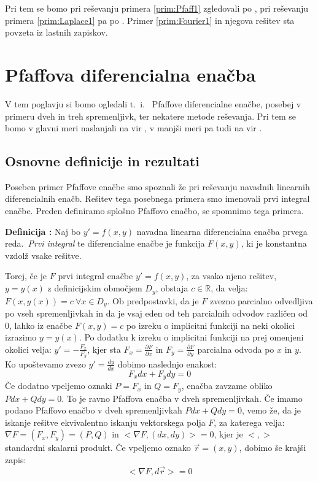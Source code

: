 \documentclass[a4paper, 10pt]{article}
\newcounter{defcount}
\newenvironment{definicija}{\begin{flushleft}\refstepcounter{defcount}\textbf{Definicija \arabic{defcount}:}}{\hfill\end{flushleft}}
\newcommand{\mth}[1]{\ensuremath{\mathbb{#1}}}
\newcommand{\R}{\mth{R}}
\newcommand{\pojem}[1]{\emph{#1}}
\begin{document}
		Pri tem se bomo pri reševanju primera \ref{prim:Pfaff1} zgledovali po \cite{bib:raman}, pri reševanju primera \ref{prim:Laplace1} pa po \cite{bib:Mag}. Primer \ref{prim:Fourier1} in njegova rešitev sta povzeta iz lastnih zapiskov.
		
	\section{Pfaffova diferencialna enačba}
		V tem poglavju si bomo ogledali t.~i.~ Pfaffove diferencialne enačbe, posebej v primeru dveh in treh spremenljivk, ter nekatere metode reševanja. Pri tem se bomo v glavni meri naslanjali na vir \cite{bib:raman}, v manjši meri pa tudi na vir \cite{bib:pfaff}.
		\subsection{Osnovne definicije in rezultati}
			Poseben primer Pfaffove enačbe smo spoznali že pri reševanju navadnih linearnih diferencialnih enačb. Rešitev tega posebnega primera smo imenovali prvi integral enačbe. Preden definiramo splošno Pfaffovo enačbo, se spomnimo tega primera.
			
			\begin{definicija}
				\label{def:1stint}
				Naj bo $y' = f(x, y)$ navadna linearna diferencialna enačba prvega reda.~\pojem{Prvi integral} te diferencialne enačbe je funkcija $F(x, y)$, ki je konstantna vzdolž vsake rešitve.
			\end{definicija}
			Torej, če je $F$ prvi integral enačbe $y' = f(x, y)$, za vsako njeno rešitev, $y = y(x)$ z definicijskim območjem $D_y$, obstaja $c\in\R$, da velja: $F(x, y(x)) = c ~\forall x\in D_y$. Ob predpostavki, da je $F$ zvezno parcialno odvedljiva po vseh spremenljivkah in da je vsaj eden od teh parcialnih odvodov različen od $0$, lahko iz enačbe $F(x, y) = c$ po izreku o implicitni funkciji na neki okolici izrazimo $y = y(x)$. Po dodatku k izreku o implicitni funkciji na prej omenjeni okolici velja: $y' = -\frac{F_x}{F_y}$, kjer sta $F_x = \frac{\partial F}{\partial x}$ in $F_y = \frac{\partial F}{\partial y}$ parcialna odvoda po $x$ in $y$. Ko upoštevamo zvezo $y' = \frac{dy}{dx}$ dobimo naslednjo enakost: $$F_x dx + F_y dy = 0$$ Če dodatno vpeljemo oznaki $P = F_x$ in $Q = F_y$, enačba zavzame obliko $P dx + Q dy = 0$. To je ravno Pfaffova enačba v dveh spremenljivkah. Če imamo podano Pfaffovo enačbo v dveh spremenljivkah $P dx + Q dy = 0$, vemo že, da je iskanje rešitve ekvivalentno iskanju vektorskega polja $F$, za katerega velja: $\nabla F = (F_x, F_y) = (P, Q)$ in $<\nabla F, (dx, dy)> = 0$, kjer je $<, >$ standardni skalarni produkt. Če vpeljemo oznako $\vec{r} = (x, y)$, dobimo še krajši zapis: $$<\nabla F, d\vec{r}> = 0$$
			
\end{document}
